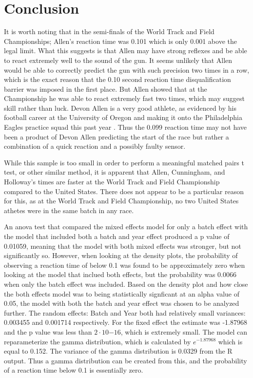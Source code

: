 \documentclass[12pt, letterpaper, titlepage]{article}
\begin{document}
\section{Conclusion}
\label{sec:conclusion}
It is worth noting that in the semi-finals of the World Track and
Field Championships; Allen's reaction time was 0.101 which is only 0.001 above
the legal limit.  What this suggests is that Allen may have strong reflexes
and be able to react extremely well to the sound of the gun.  It seems unlikely that
Allen would be able to correctly predict the gun with such precision two times in a row,
which is the exact reason that the 0.10 second reaction time disqualification barrier was
imposed in the first place.  But Allen showed that at the Championship he was able to
react extremely fast two times, which may suggest skill rather than luck. Devon Allen is a very good athlete, as evidenced by his football career at the University of Oregon
and making it onto the Philadelphia Eagles practice squad this past year \citep{Hurley}.
Thus the 0.099 reaction time may not have been a product of Devon Allen
predicting the start of the race but rather a combination of a quick reaction 
and a possibly faulty sensor.

While this sample is too small in order
to perform a meaningful matched pairs t test, or other similar method, it is apparent
that Allen, Cunningham, and Holloway's times are faster at the World Track and Field
Championship compared to the United States.  There does not appear to be a particular
reason for this, as at the World Track and Field Championship, no two United States
athetes were in the same batch in any race.

An anova test that compared the mixed effects model for only a batch effect with the
model that included both a batch and year effect produced a p value of 0.01059, meaning
that the model with both mixed effects was stronger, but not significantly so.  However,
when looking at the density plots, the probability of observing a reaction time of below
0.1 was found to be approximately zero when looking at the model that inclued both effects,
but the probability was 0.0066 when only the batch effect was included.  Based on the density
plot and how close the both effects model was to being statistically signficant at an alpha
value of 0.05, the model with both the batch and year effect was chosen to be analyzed further.
The random effects: Batch and Year both had relatively small variances: 0.003455 and 0.001714
respectively.  For the fixed effect the estimate was -1.87968 and the p value was less than
$2\cdot10{-16}$, which is extremely small.  The model can reparameterize the gamma distribution,
which is calculated by $e^{-1.87968}$ which is equal to 0.152.  The variance of the gamma
distribution is 0.0329 from the R output.  Thus a gamma distribution can be created from
this, and the probability of a reaction time below 0.1 is essentially zero.  
\end{document}
